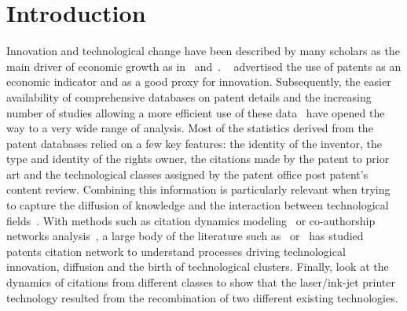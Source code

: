 \documentclass[10pt,A4]{article}
\begin{document}
\section{Introduction}
Innovation and technological change have been described by many scholars as the main driver of economic growth as in~\cite{aghionhowitt1992} and~\cite{romer1990}. ~\cite{RePEc:nbr:nberwo:3301} advertised the use of patents as an economic indicator and as a good proxy for innovation. Subsequently, the easier availability of comprehensive databases on patent details and the increasing number of studies allowing a more efficient use of these data~\cite{hall2001}  have opened the way to a very wide range of analysis. Most of the statistics derived from the patent databases relied on a few key features: the identity of the inventor, the type and identity of the rights owner, the citations made by the patent to prior art and the technological classes assigned by the patent office post patent's content review. Combining this information is particularly relevant when trying to capture the diffusion of knowledge and the interaction between technological fields~\cite{Youn:2015fk}. With methods such as citation dynamics modeling~\cite{2013arXiv1310.8220N} or co-authorship networks analysis~\cite{2014arXiv1402.7268S}, a large body of the literature such as~\cite{sorenson2006complexity} or~\cite{kay2014patent} has studied patents citation network to understand processes driving technological innovation, diffusion and the birth of technological clusters. Finally, \cite{bruck2016recognition} look at the dynamics of citations from different classes to show that the laser/ink-jet printer technology resulted from the recombination of two different existing technologies. 
\end{document}
